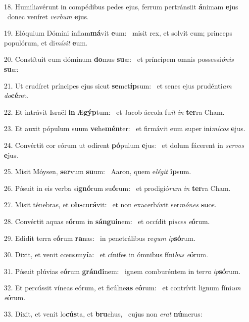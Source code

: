 18. Humiliavérunt in compédibus pedes ejus, ferrum pertránsiit \textbf{á}nimam \textbf{e}jus \ast\  donec veníret \textit{ver}\textit{bum} \textbf{e}jus.\

19. Elóquium Dómini inflam\textbf{má}vit \textbf{e}um: \ast\  misit rex, et solvit eum; princeps populórum, et di\textit{mí}\textit{sit} \textbf{e}um.\

20. Constítuit eum dóminum \textbf{do}mus \textbf{su}æ: \ast\  et príncipem omnis possessi\textit{ó}\textit{nis} \textbf{su}æ:\

21. Ut erudíret príncipes ejus sicut \textbf{se}met\textbf{íp}sum: \ast\  et senes ejus prudénti\textit{am} \textit{do}\textbf{cé}ret.\

22. Et intrávit Israël \textbf{in} Æ\textbf{gýp}tum: \ast\  et Jacob áccola fu\textit{it} \textit{in} \textbf{ter}ra Cham.\

23. Et auxit pópulum suum \textbf{ve}he\textbf{mén}ter: \ast\  et firmávit eum super ini\textit{mí}\textit{cos} \textbf{e}jus.\

24. Convértit cor eórum ut odírent \textbf{pó}pulum \textbf{e}jus: \ast\  et dolum fácerent in \textit{ser}\textit{vos} \textbf{e}jus.\

25. Misit Móysen, \textbf{ser}vum \textbf{su}um: \ast\  Aaron, quem e\textit{lé}\textit{git} \textbf{ip}sum.\

26. Pósuit in eis verba si\textbf{gnó}rum su\textbf{ó}rum: \ast\  et prodigió\textit{rum} \textit{in} \textbf{ter}ra Cham.\

27. Misit ténebras, et \textbf{obs}cu\textbf{rá}vit: \ast\  et non exacerbávit ser\textit{mó}\textit{nes} \textbf{su}os.\

28. Convértit aquas e\textbf{ó}rum in \textbf{sán}\textbf{gui}nem: \ast\  et occídit pi\textit{sces} \textit{e}\textbf{ó}rum.\

29. Edidit terra e\textbf{ó}rum \textbf{ra}nas: \ast\  in penetrálibus re\textit{gum} \textit{ip}\textbf{só}rum.\

30. Dixit, et venit cœ\textbf{no}my\textbf{í}a: \ast\  et cínifes in ómnibus fíni\textit{bus} \textit{e}\textbf{ó}rum.\

31. Pósuit plúvias e\textbf{ó}rum \textbf{grán}\textbf{di}nem: \ast\  ignem comburéntem in ter\textit{ra} \textit{ip}\textbf{só}rum.\

32. Et percússit víneas eórum, et ficúlne\textbf{as} e\textbf{ó}rum: \ast\  et contrívit lignum fíni\textit{um} \textit{e}\textbf{ó}rum.\

33. Dixit, et venit lo\textbf{cús}ta, et \textbf{bru}chus, \ast\  cujus non \textit{e}\textit{rat} \textbf{nú}merus:\


